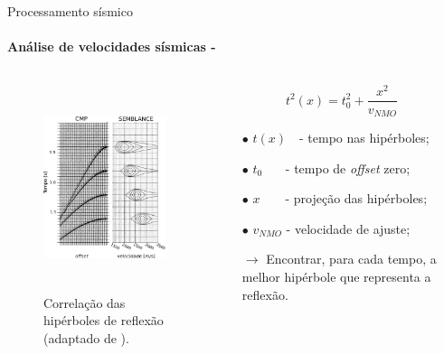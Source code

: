 \documentclass[xcolor=dvipsnames,t]{beamer}
\begin{document}
\begin{frame}{Processamento sísmico}
\framesubtitle{Análise de velocidades sísmicas - }	
	
\begin{columns}[onlytextwidth, T]
	\begin{column}{.50\textwidth}
		\begin{figure}[h]
			\includegraphics[width=6cm,height=6cm]{../imagens/cmpSemblance.png}	
			\tiny{\caption{Correlação das hipérboles de reflexão (adaptado de ).}} 	
			\label{velan}
		\end{figure}	
	\end{column}

	\begin{column}{.50\textwidth}
		\begin{equation}
			t^2(x) = t^2_0 + \dfrac{x^2}{v_{NMO}}  
		\end{equation}

		\begin{itemize}
			\small
			\item[$\bullet$] $t(x)\,\,\,\,$ - tempo nas hipérboles; 
			\item[$\bullet$] $t_0\,\,\,\,\,\,\,\,\,$ - tempo de \textit{offset} zero; 
			\item[$\bullet$] $x\,\,\,\,\,\,\,\,\,\,$ - projeção das hipérboles;
			\item[$\bullet$] $v_{NMO}$ - velocidade de ajuste;
			\bigskip\bigskip
			
			\item[$\to$] Encontrar, para cada tempo, a melhor hipérbole que representa a reflexão.
		\end{itemize}
	\end{column}
\end{columns}	
		
\end{frame}
\end{document}
